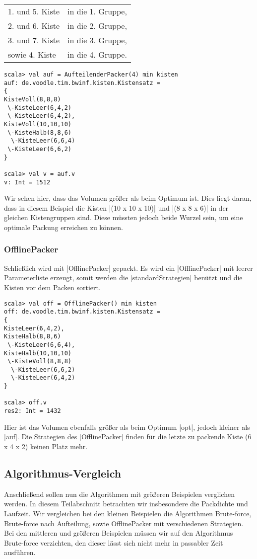 \begin{tabular}{ll}
 1. und 5. Kiste & in die 1. Gruppe, \\
 2. und 6. Kiste & in die 2. Gruppe, \\
 3. und 7. Kiste & in die 3. Gruppe, \\
  sowie 4. Kiste & in die 4. Gruppe. \\
\end{tabular}

\begin{lstlisting}
scala> val auf = AufteilenderPacker(4) min kisten
auf: de.voodle.tim.bwinf.kisten.Kistensatz = 
{
KisteVoll(8,8,8)
 \-KisteLeer(6,4,2)
 \-KisteLeer(6,4,2),
KisteVoll(10,10,10)
 \-KisteHalb(8,8,6)
  \-KisteLeer(6,6,4)
 \-KisteLeer(6,6,2)
}

scala> val v = auf.v
v: Int = 1512
\end{lstlisting}
 Wir sehen hier, dass das Volumen größer als beim Optimum ist.
 Dies liegt daran, dass in diesem Beispiel die Kisten |(10 x 10 x 10)| und |(8 x 8 x 6)| in der gleichen Kistengruppen sind.
 Diese müssten jedoch beide Wurzel sein, um eine optimale Packung erreichen zu können.

\subsubsection*{OfflinePacker}
 Schließlich wird mit |OfflinePacker| gepackt.
 Es wird ein |OfflinePacker| mit leerer Parameterliste erzeugt, somit werden die |standardStrategien| benützt und die Kisten vor dem Packen sortiert.
\begin{lstlisting}
scala> val off = OfflinePacker() min kisten
off: de.voodle.tim.bwinf.kisten.Kistensatz = 
{
KisteLeer(6,4,2),
KisteHalb(8,8,6)
 \-KisteLeer(6,6,4),
KisteHalb(10,10,10)
 \-KisteVoll(8,8,8)
  \-KisteLeer(6,6,2)
  \-KisteLeer(6,4,2)
}

scala> off.v
res2: Int = 1432

\end{lstlisting}
 Hier ist das Volumen ebenfalls größer als beim Optimum |opt|, jedoch kleiner als |auf|.
 Die Strategien des |OfflinePacker| finden für die letzte zu packende Kiste (6 x 4 x 2) keinen Platz mehr.

\subsection{Algorithmus-Vergleich}
\label{algcont}
 Anschließend sollen nun die Algorithmen mit größeren Beispielen verglichen werden.
 In diesem Teilabschnitt betrachten wir insbesondere die Packdichte und Laufzeit.
 Wir vergleichen bei den kleinen Beispielen die Algorithmen Brute-force, Brute-force nach Aufteilung, sowie OfflinePacker mit verschiedenen Strategien.
 Bei den mittleren und größeren Beispielen müssen wir auf den Algorithmus Brute-force verzichten, den dieser lässt sich nicht mehr in passabler Zeit ausführen.

